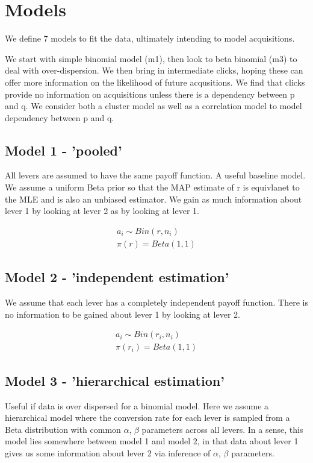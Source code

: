 \documentclass[12pt]{article}
\begin{document}
\section{Models}
We define 7 models to fit the data, ultimately intending to model acquisitions.

We start with simple binomial model (m1), then look to beta binomial (m3) to deal with over-dispersion. We then bring in intermediate clicks, hoping these can offer more information on the likelihood of future acqusitions. We find that clicks provide no information on acquisitions unless there is a dependency between p and q. We consider both a cluster model as well as a correlation model to model dependency between p and q.

\subsection{Model 1 - 'pooled'} 
All levers are assumed to have the same payoff function. A useful baseline model. We assume a uniform Beta prior so that the MAP estimate of r is equivlanet to the MLE and is also an unbiased estimator. We gain as much information about lever 1 by looking at lever 2 as by looking at lever 1.

  \begin{align}
	a_i \sim Bin(r,n_i) \\
	\pi(r) = Beta(1,1)
  \end{align}

\subsection{Model 2 - 'independent estimation'} 
We assume that each lever has a completely independent payoff function. There is no information to be gained about lever 1 by looking at lever 2.

  \begin{align}
	a_i \sim Bin(r_i,n_i) \\
	\pi(r_i) = Beta(1,1)
  \end{align}

\subsection{Model 3 - 'hierarchical estimation'} 
Useful if data is over dispersed for a binomial model. Here we assume a hierarchical model where the conversion rate for each lever is sampled from a Beta distribution with common $\alpha$, $\beta$ parameters across all levers. In a sense, this model lies somewhere between model 1 and model 2, in that data about lever 1 gives us some information about lever 2 via inference of $\alpha$, $\beta$ parameters. 
\end{document}
